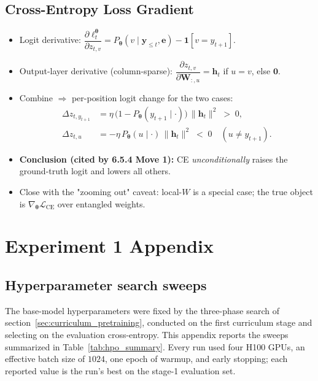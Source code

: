 \documentclass[titlepage,a4paper,11pt]{report}
\begin{document}
    \subsection{Cross-Entropy Loss Gradient}\label{app:obj_ce}
    \begin{itemize}
        \item Logit derivative:
              $\dfrac{\partial \ell_t^{\bm\theta}}{\partial z_{t,v}}
               = P_{\bm\theta}(v\mid\bm y_{\le t},\bm e) - \mathbf{1}[v=y_{t+1}]$.
        \item Output-layer derivative (column-sparse):
              $\dfrac{\partial z_{t,v}}{\partial \bm W_{:,u}} = \bm h_t$ if $u=v$, else $\bm 0$.
        \item Combine $\Rightarrow$ per-position logit change for the two cases:
        \begin{align}
            \Delta z_{t,y_{t+1}} &= \eta\,\bigl(1 - P_{\bm\theta}(y_{t+1}\mid\cdot)\bigr)\,\|\bm h_t\|^2 \;>\;0,\\
            \Delta z_{t,u} &= -\eta\,P_{\bm\theta}(u\mid\cdot)\,\|\bm h_t\|^2 \;<\;0 \quad (u\neq y_{t+1}).
        \end{align}
        \item \textbf{Conclusion (cited by 6.5.4 Move 1):} CE \emph{unconditionally}
              raises the ground-truth logit and lowers all others.
        \item Close with the "zooming out" caveat: local-$W$ is a special case; the true
              object is $\nabla_{\bm\theta}\mathcal{L}_{\text{CE}}$ over entangled weights.
              \cite{elhage_toy_2022, olah_zoom_2020}
    \end{itemize}



\section{Experiment 1 Appendix}
    \subsection{Hyperparameter search sweeps}\label{app:hpo}
    The base-model hyperparameters were fixed by the three-phase search of section~\ref{sec:curriculum_pretraining}, conducted on the first curriculum stage and selecting on the evaluation cross-entropy. This appendix reports the sweeps summarized in Table~\ref{tab:hpo_summary}. Every run used four \textsc{H100} GPUs, an effective batch size of $1024$, one epoch of warmup, and early stopping; each reported value is the run's best on the stage-1 evaluation set.
    
\end{document}
